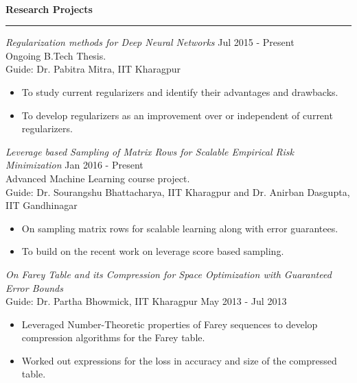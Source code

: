 \documentclass[a4paper,10pt,oneside]{article}
\newcommand{\heading}[1]{
 {\Large \textbf{#1}}
  \vspace{0.4em}
  \hrule
  \vspace{0.4em}
}
\newcommand{\SmallEntryGap}{ \vspace{0.6em} }
\newcommand{\EntryGap}{ ~\\ }
\begin{document}

\EntryGap
\heading{Research Projects}
\SmallEntryGap
\emph{Regularization methods for Deep Neural Networks} \hfill Jul 2015 - Present\\
Ongoing B.Tech Thesis.\\
Guide: Dr. Pabitra Mitra, IIT Kharagpur
\begin{itemize}[noitemsep, nolistsep]
  \item To study current regularizers and identify their advantages and drawbacks.
  \item To develop regularizers as an improvement over or independent of current regularizers.
\end{itemize}

\SmallEntryGap

\emph{Leverage based Sampling of Matrix Rows for Scalable Empirical Risk Minimization} \hfill Jan 2016 - Present \\
Advanced Machine Learning course project.\\
Guide: Dr. Sourangshu Bhattacharya, IIT Kharagpur and Dr. Anirban Dasgupta, IIT Gandhinagar
\begin{itemize}[noitemsep, nolistsep]
 \item On sampling matrix rows for scalable learning along with error guarantees.
 \item To build on the recent work on leverage score based sampling.
\end{itemize}

\SmallEntryGap

\emph{On Farey Table and its Compression for Space Optimization with Guaranteed Error Bounds} \\
Guide: Dr. Partha Bhowmick, IIT Kharagpur \hfill May 2013 - Jul 2013 \\
\begin{itemize}[noitemsep, nolistsep]
 \item Leveraged Number-Theoretic properties of Farey sequences to develop compression algorithms for the Farey table.
 \item Worked out expressions for the loss in accuracy and size of the compressed table.
\end{itemize}


\EntryGap
\end{document}

